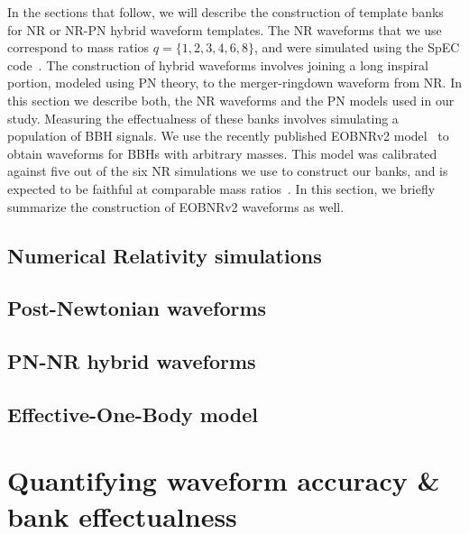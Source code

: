 \documentclass[aps,
prd,
twocolumn,
superscriptaddress,
lengthcheck,showpacs,letterpaper,nofootinbib,
floatfix]{revtex4-1}
\begin{document}
In the sections that follow, we will describe the construction of template 
banks for NR or NR-PN hybrid waveform templates. The NR waveforms that we
use correspond to mass ratios $q=\{1,2,3,4,6,8\}$, and were simulated using
the SpEC code~\cite{spec}. The construction of hybrid
waveforms involves joining a long inspiral portion, modeled using PN theory,
to the merger-ringdown waveform from NR. In this section we describe both, the 
NR waveforms and the PN models used in our study. Measuring the effectualness
of these banks involves simulating a population of BBH signals. We use the 
recently published EOBNRv2 model~\cite{BuonannoEOBv2Main} to obtain waveforms
for BBHs with arbitrary masses. This model was calibrated against five out of 
the six NR simulations we use to construct our banks, and is expected to be 
faithful at comparable mass ratios~\cite{BuonannoEOBv2Main}. In this section, 
we briefly summarize the construction of EOBNRv2 waveforms as well.

\subsection{Numerical Relativity simulations}\label{s2:NRwaveforms}


\subsection{Post-Newtonian waveforms}\label{s2:PNwaveforms}

 
\subsection{PN-NR hybrid waveforms}\label{s2:NRpNhybridwaveforms}


\subsection{Effective-One-Body model}\label{s2:EOBwaveforms}


\section{Quantifying waveform accuracy \& bank effectualness}\label{s1:quantifyingerrors}

\end{document}
